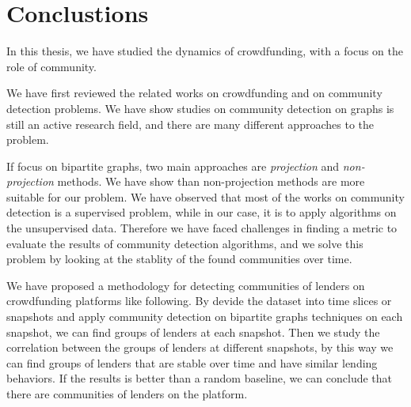 \section{Conclustions}
\begin{comment}

This community finding is a unsupervised problem.
Hence, there are different methodology for answer the question


SOmething to try

- \lstinline|adjusted_rand_score|

\section{Future works}

\begin{itemize}
	\item Extend to other platforms
	\item Transform the problem into a classical clustering problem where cluster is a Tag/Sector
	      and apply classical dynamic clustering tools.
	      Note that this part is currently in trying phase.
	      If we have time to make it now, we could move it to the section 4.
\end{itemize}
\end{comment}

In this thesis, we have studied the dynamics of crowdfunding, with a focus on the role of community.

We have first reviewed the related works on crowdfunding and on community detection problems.
We have show studies on community detection on graphs is still an active research field,
and there are many different approaches to the problem.

If focus on bipartite graphs, two main approaches are \textit{projection} and \textit{non-projection} methods.
We have show than non-projection methods are more suitable for our problem.
We have observed that most of the works on community detection is a supervised problem,
while in our case, it is to apply algorithms on the unsupervised data.
Therefore we have faced challenges in finding a metric to evaluate the results of community detection algorithms,
and we solve this problem by looking at the stablity of the found communities over time.

We have proposed a methodology for detecting communities of lenders on crowdfunding platforms like following.
By devide the dataset into time slices or snapshots
and apply community detection on bipartite graphs techniques on each snapshot,
we can find groups of lenders at each snapshot.
Then we study the correlation between the groups of lenders at different snapshots,
by this way we can find groups of lenders that are stable over time and have similar lending behaviors.
If the results is better than a random baseline, we can conclude that there are communities of lenders on the platform.


